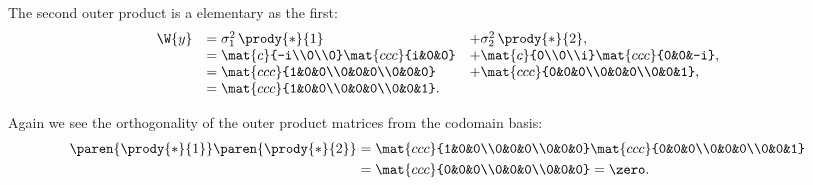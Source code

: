 The second outer product is a elementary as the first:
\begin{equation}
  \begin{array}{lll}
     \W{y} &= \sigma_{1}^{2}\, \prody{*}{1} &+ \sigma_{2}^{2}\, \prody{*}{2},\\
      &= \mat{c}{-i\\0\\0}\mat{ccc}{i&0&0} &+
         \mat{c}{0\\0\\i}\mat{ccc}{0&0&-i},\\
      &= \mat{ccc}{1&0&0\\0&0&0\\0&0&0} &+
         \mat{ccc}{0&0&0\\0&0&0\\0&0&1},\\
      &= \mat{ccc}{1&0&0\\0&0&0\\0&0&1}.
  \end{array}
\end{equation}

Again we see the orthogonality of the outer product matrices from the codomain basis:
\begin{equation}
  \begin{split}
     \paren{\prody{*}{1}} \paren{\prody{*}{2}} &=
     \mat{ccc}{1&0&0\\0&0&0\\0&0&0}
     \mat{ccc}{0&0&0\\0&0&0\\0&0&1} \\
     & = \mat{ccc}{0&0&0\\0&0&0\\0&0&0} = \zero.
  \end{split}
\end{equation}

\endinput
